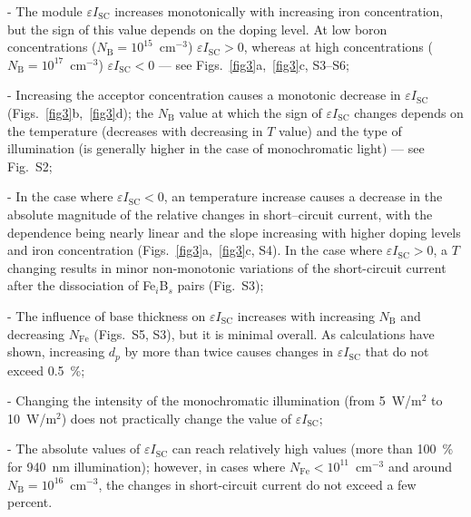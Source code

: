 \documentclass[a4paper,fleqn]{cas-sc}
\begin{document}
\noindent
- The module $\varepsilon I_\mathrm{SC}$ increases monotonically with increasing iron concentration,
    but the sign of this value depends on the doping level.
    At low boron concentrations ($N_\mathrm{B}=10^{15}$~cm$^{-3}$) $\varepsilon I_\mathrm{SC} > 0$,
    whereas at high concentrations ($N_\mathrm{B}=10^{17}$~cm$^{-3}$) $\varepsilon I_\mathrm{SC} < 0$ --- see Figs.~\ref{fig3}a,~\ref{fig3}c, S3--S6;

\noindent
- Increasing the acceptor concentration causes a monotonic decrease in $\varepsilon I_\mathrm{SC}$ (Figs.~\ref{fig3}b,~\ref{fig3}d);
    the $N_\mathrm{B}$ value at which the sign of $\varepsilon I_\mathrm{SC}$ changes depends on the temperature
    (decreases with decreasing in $T$ value) and the type of illumination (is generally higher in the case of monochromatic light) --- see Fig.~S2;

\noindent
 - In the case where $\varepsilon I_\mathrm{SC} < 0$, an temperature increase causes a decrease in the absolute magnitude
    of the relative changes in short--circuit current, with the dependence being nearly linear and
    the slope increasing with higher doping levels and iron concentration (Figs.~\ref{fig3}a,~\ref{fig3}c, S4).
    In the case where $\varepsilon I_\mathrm{SC} > 0$,
    a $T$ changing results in minor non-monotonic variations of the short-circuit current after the dissociation of Fe$_i$B$_s$  pairs (Fig.~S3);

\noindent
- The influence of base thickness on $\varepsilon I_\mathrm{SC}$ increases with
    increasing $N_\mathrm{B}$ and decreasing $N_\mathrm{Fe}$ (Figs.~S5, S3), but it is minimal overall.
    As calculations have shown, increasing $d_p$ by more than twice causes changes in $\varepsilon I_\mathrm{SC}$ that do not exceed 0.5~\%;

\noindent
- Changing the intensity of the monochromatic illumination (from 5~W/m$^{2}$ to 10~W/m$^{2}$) does not practically change the value of $\varepsilon I_\mathrm{SC}$;


\noindent
- The absolute values of $\varepsilon I_\mathrm{SC}$ can reach relatively high values (more than 100~\% for 940~nm illumination);
    however, in cases where $N_\mathrm{Fe}<10^{11}$~cm$^{-3}$ and around $N_\mathrm{B}=10^{16}$~cm$^{-3}$, the changes in short-circuit current do not exceed a few percent.
\end{document}
